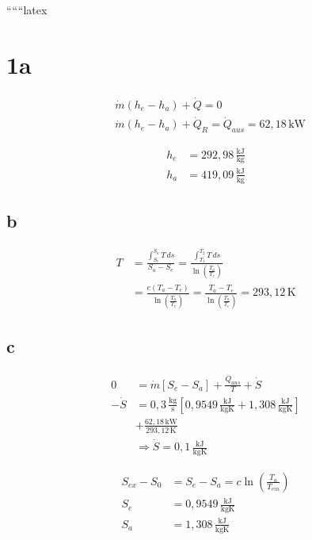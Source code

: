 
``````latex


\section*{1a}

\begin{align*}
&\dot{m}(h_e - h_a) + \dot{Q} = 0 \\
&\dot{m}(h_e - h_a) + \dot{Q}_R = \dot{Q}_{aus} = 62,18 \, \text{kW}
\end{align*}

\begin{align*}
h_e &= 292,98 \, \frac{\text{kJ}}{\text{kg}} \\
h_a &= 419,09 \, \frac{\text{kJ}}{\text{kg}}
\end{align*}

\subsection*{b}

\begin{align*}
T &= \frac{\int_{S_e}^{S_a} T \, ds}{S_a - S_e} = \frac{\int_{T_1}^{T_2} T \, ds}{\ln \left( \frac{T_a}{T_e} \right)} \\
&= \frac{e \left( T_a - T_e \right)}{\ln \left( \frac{T_a}{T_e} \right)} = \frac{T_a - T_e}{\ln \left( \frac{T_a}{T_e} \right)} = 293,12 \, \text{K}
\end{align*}

\subsection*{c}

\begin{align*}
0 &= \dot{m} \left[ S_e - S_a \right] + \frac{\dot{Q}_{aus}}{T} + \dot{S} \\
-\dot{S} &= 0,3 \, \frac{\text{kg}}{\text{s}} \left[ 0,9549 \, \frac{\text{kJ}}{\text{kgK}} + 1,308 \, \frac{\text{kJ}}{\text{kgK}} \right] \\
&+ \frac{62,18 \, \text{kW}}{293,12 \, \text{K}} \\
&\Rightarrow \dot{S} = 0,1 \, \frac{\text{kJ}}{\text{kgK}}
\end{align*}

\begin{align*}
S_{ex} - S_{0} &= S_{e} - S_{a} = c \ln \left( \frac{T_a}{T_{ein}} \right) \\
S_e &= 0,9549 \, \frac{\text{kJ}}{\text{kgK}} \\
S_a &= 1,308 \, \frac{\text{kJ}}{\text{kgK}}
\end{align*}

